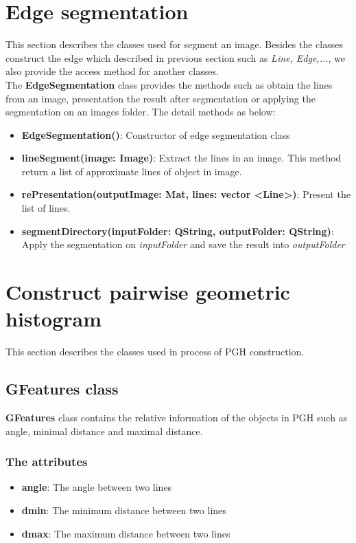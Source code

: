 \section{Edge segmentation }
This section describes the classes used for segment an image. Besides the classes construct the edge which described in previous section such as \textit{Line, Edge,...}, we also provide the access method for another classes.\\[0.2cm]
The \textbf{EdgeSegmentation} class provides the methods such as obtain the lines from an image, presentation the result after segmentation or applying the segmentation on an images folder. The detail methods as below:
\begin{itemize}
\item\textbf{EdgeSegmentation()}: Constructor of edge segmentation class
\item\textbf{lineSegment(image: Image)}: Extract the lines in an image. This method return a list of approximate lines of object in image. 
\item\textbf{rePresentation(outputImage: Mat, lines: vector \textless Line\textgreater)}: Present the list of lines.
\item\textbf{segmentDirectory(inputFolder: QString, outputFolder: QString)}: Apply the segmentation on \textit{inputFolder} and save the result into \textit{outputFolder}
\end{itemize}
\section{Construct pairwise geometric histogram}
This section describes the classes used in process of PGH  construction.
\subsection{GFeatures class}
\textbf{GFeatures} class contains the relative information of the objects in PGH such as angle, minimal distance and maximal distance.
\subsubsection{The attributes}
\begin{itemize}
\item\textbf{angle}: The angle between two lines
\item\textbf{dmin}: The minimum distance between two lines
\item\textbf{dmax}: The maximum distance between two lines
\end{itemize}
